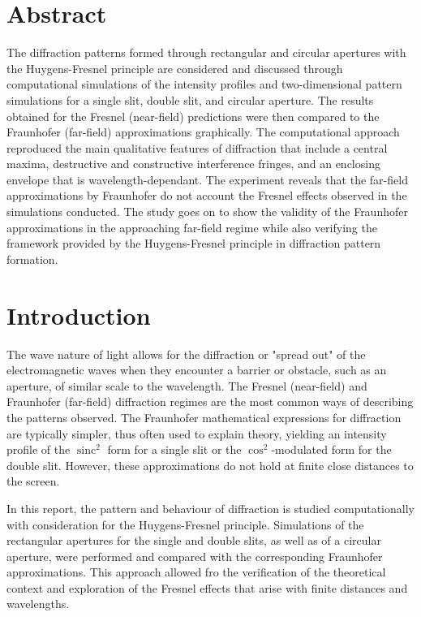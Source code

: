 \documentclass[12pt]{article}
\DeclareMathOperator{\sinc}{sinc}
\begin{document}
\section*{Abstract}
\thispagestyle{empty}

The diffraction patterns formed through rectangular and circular apertures with the Huygens-Fresnel principle are considered and discussed through computational simulations of the intensity profiles
and two-dimensional pattern simulations for a single slit, double slit, and circular aperture. The results obtained for the Fresnel (near-field) predictions were then compared to the Fraunhofer (far-field) approximations graphically.
The computational approach reproduced the main qualitative features of diffraction that include a central maxima, destructive and constructive interference fringes, and an enclosing envelope that is wavelength-dependant.
The experiment reveals that the far-field approximations by Fraunhofer do not account the Fresnel effects observed in the simulations conducted. The study goes on to show the validity of the Fraunhofer approximations
in the approaching far-field regime while also verifying the framework provided by the Huygens-Fresnel principle in diffraction pattern formation.

\newpage


\setcounter{page}{1}
\section{Introduction} \label{sec:1}

The wave nature of light allows for the diffraction or "spread out" of the electromagnetic waves when they encounter a barrier or obstacle, such as an aperture, of similar scale to the wavelength.
The Fresnel (near-field) and Fraunhofer (far-field) diffraction regimes are the most common ways of describing the patterns observed. The Fraunhofer mathematical expressions for diffraction are typically simpler, thus often used to explain theory, yielding
an intensity profile of the \( \sinc^2 \) form for a single slit or the \( \cos^2 \)-modulated form for the double slit. However, these approximations do not hold at finite close distances to the screen. \cite{Born_Wolf_Bhatia_Clemmow_Gabor_Stokes_Taylor_Wayman_Wilcock_1999,hecht2012optics,openstax3}

In this report, the pattern and behaviour of diffraction is studied computationally with consideration for the Huygens-Fresnel principle. Simulations of the rectangular apertures for the single and double slits, as well as
of a circular aperture, were performed and compared with the corresponding Fraunhofer approximations. This approach allowed fro the verification of the theoretical context and exploration of the Fresnel effects that arise with finite distances and wavelengths.
\end{document}
